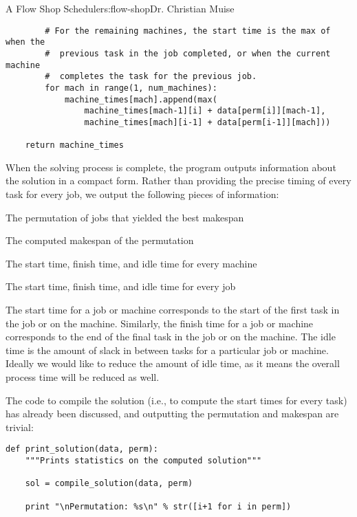 \begin{aosachapter}{A Flow Shop Scheduler}{s:flow-shop}{Dr. Christian Muise}
\begin{verbatim}
        # For the remaining machines, the start time is the max of when the
        #  previous task in the job completed, or when the current machine
        #  completes the task for the previous job.
        for mach in range(1, num_machines):
            machine_times[mach].append(max(
                machine_times[mach-1][i] + data[perm[i]][mach-1],
                machine_times[mach][i-1] + data[perm[i-1]][mach]))

    return machine_times
\end{verbatim}

\label{printing-solutions}

When the solving process is complete, the program outputs information
about the solution in a compact form. Rather than providing the precise
timing of every task for every job, we output the following pieces of
information:

\begin{aosaenumerate}
\def\labelenumi{\arabic{enumi}.}

\item
  The permutation of jobs that yielded the best makespan
\item
  The computed makespan of the permutation
\item
  The start time, finish time, and idle time for every machine
\item
  The start time, finish time, and idle time for every job
\end{aosaenumerate}

The start time for a job or machine corresponds to the start of the
first task in the job or on the machine. Similarly, the finish time for
a job or machine corresponds to the end of the final task in the job or
on the machine. The idle time is the amount of slack in between tasks
for a particular job or machine. Ideally we would like to reduce the
amount of idle time, as it means the overall process time will be
reduced as well.

The code to compile the solution (i.e., to compute the start times for
every task) has already been discussed, and outputting the permutation
and makespan are trivial:

\begin{verbatim}
def print_solution(data, perm):
    """Prints statistics on the computed solution"""

    sol = compile_solution(data, perm)

    print "\nPermutation: %s\n" % str([i+1 for i in perm])


\end{verbatim}
\end{aosachapter}
